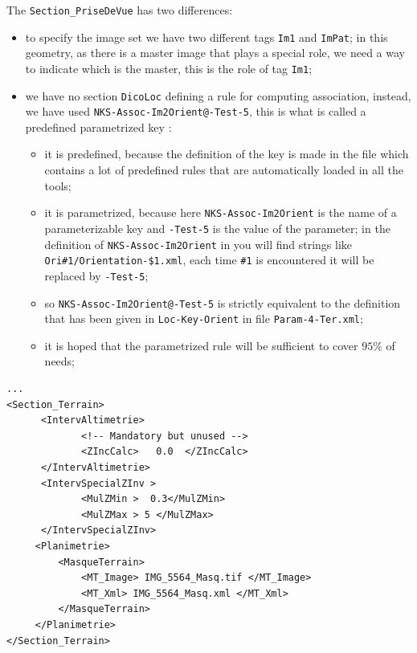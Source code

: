 \label{SECASSOC:PRED}
The {\tt Section\_PriseDeVue} has two differences:

\begin{itemize}
   \item  to specify the image set we have two different tags {\tt Im1} and {\tt ImPat};
          in this geometry, as there is a master image that plays a special role, we need
          a way to indicate which is the master, this is the role of tag {\tt Im1};

   \item  we have no section {\tt DicoLoc} defining a rule for computing association, 
          instead, we have used {\tt NKS-Assoc-Im2Orient@-Test-5}, this is what is
          called a predefined parametrized key : 

\begin{itemize}
    \item  it is predefined, because the definition of the key is made in the file
            which contains a lot
           of predefined rules that are automatically loaded in all the tools;

    \item  it is parametrized, because here {\tt NKS-Assoc-Im2Orient} is the name of
           a parameterizable key and {\tt -Test-5} is the value of the parameter;
           in the definition of {\tt NKS-Assoc-Im2Orient} in 
           you will find strings like {\tt Ori\#1/Orientation-\$1.xml}, each time {\tt \#1} is
           encountered it will be replaced by {\tt -Test-5};

     \item so {\tt NKS-Assoc-Im2Orient@-Test-5} is strictly equivalent to the definition that has been
           given in {\tt Loc-Key-Orient} in file {\tt Param-4-Ter.xml};

     \item it is hoped that the parametrized rule will be sufficient to cover $95\%$ of needs;
\end{itemize}
\end{itemize}


{\scriptsize
\begin{verbatim}
...
<Section_Terrain>
      <IntervAltimetrie>
             <!-- Mandatory but unused -->
             <ZIncCalc>   0.0  </ZIncCalc>
      </IntervAltimetrie>
      <IntervSpecialZInv >
             <MulZMin >  0.3</MulZMin>
             <MulZMax > 5 </MulZMax>
      </IntervSpecialZInv>
     <Planimetrie>
         <MasqueTerrain>
             <MT_Image> IMG_5564_Masq.tif </MT_Image>
             <MT_Xml> IMG_5564_Masq.xml </MT_Xml>
         </MasqueTerrain>
     </Planimetrie>
</Section_Terrain>
\end{verbatim}
}

